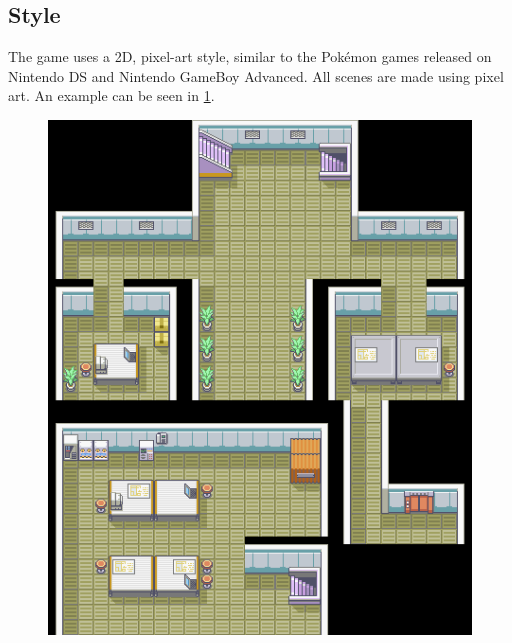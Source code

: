 \documentclass[a4paper,10pt,english]{article}
\begin{document}
\subsection*{Style}
The game uses a 2D, pixel-art style, similar to the Pokémon games released on Nintendo DS and Nintendo GameBoy Advanced. All scenes are made using pixel art. An example can be seen in \ref{Fig:Style1A}.

\begin{figure}[h]

\centering
\includegraphics[width=\linewidth]{Rocket_Hideout_B1F_FRLG.png}
\label{Fig:Style1A}



\end{figure} 
\end{document}
